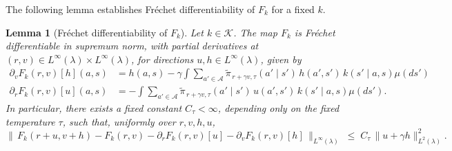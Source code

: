 \documentclass[11pt]{article}
\theoremstyle{plain}
\newtheorem{lemma}[theorem]{Lemma}
\begin{document}
The following lemma establishes Fréchet differentiability of $F_{k}$ for a fixed $k$.

 


\begin{lemma}[Fréchet differentiability of $F_k$]
\label{lemma::softbellmanissmooth}
Let $k \in \mathcal{K}$. The map $F_{k}$ is Fréchet differentiable in supremum norm, with partial derivatives at \((r,v) \in L^\infty(\lambda) \times L^\infty(\lambda)\), for directions $u,h \in L^\infty(\lambda)$, given by
\begin{align*}
\partial_v F_{k}(r,v)[h](a,s)
&= h(a,s) - \gamma \int \sum_{a' \in \mathcal{A}} \widetilde{\pi}_{\,r+\gamma v,\tau}(a' \mid s')\, h(a',s')\, k(s' \mid a,s) \mu(ds')\\
\partial_r F_{k}(r,v)[u](a,s)
&= - \int \sum_{a' \in \mathcal{A}} \widetilde{\pi}_{\,r+\gamma v,\tau}(a' \mid s')\, u(a',s')\, k(s' \mid a,s) \mu(ds').
\end{align*}
In particular, there exists a fixed constant \(C_\tau < \infty\), depending only on the fixed temperature $\tau$, such that, uniformly over $r,v,h,u$, 
\[
\|\,F_{k}(r+u,v+h) - F_{k}(r,v) - \partial_r F_{k}(r,v)[u] - \partial_v F_{k}(r,v)[h]\,\|_{L^\infty(\lambda)}
\;\le\; C_\tau \,\|u + \gamma h\|_{L^2(\lambda)}^{2}.
\]
\end{lemma}
\end{document}
